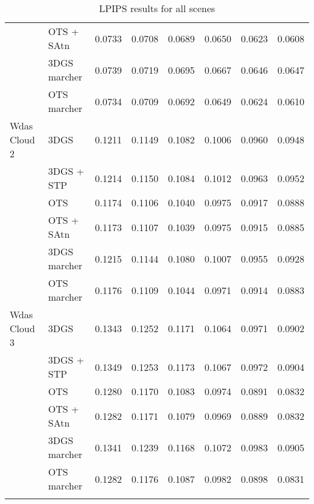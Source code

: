 \begin{longtable}[H]{llrrrrrr}
 & OTS + SAtn & 0.0733 & 0.0708 & 0.0689 & 0.0650 & 0.0623 & 0.0608 \\
 & 3DGS marcher & 0.0739 & 0.0719 & 0.0695 & 0.0667 & 0.0646 & 0.0647 \\
 & OTS marcher & 0.0734 & 0.0709 & 0.0692 & 0.0649 & 0.0624 & 0.0610 \\
Wdas Cloud 2 & 3DGS & 0.1211 & 0.1149 & 0.1082 & 0.1006 & 0.0960 & 0.0948 \\
 & 3DGS + STP & 0.1214 & 0.1150 & 0.1084 & 0.1012 & 0.0963 & 0.0952 \\
 & OTS & 0.1174 & 0.1106 & 0.1040 & 0.0975 & 0.0917 & 0.0888 \\
 & OTS + SAtn & 0.1173 & 0.1107 & 0.1039 & 0.0975 & 0.0915 & 0.0885 \\
 & 3DGS marcher & 0.1215 & 0.1144 & 0.1080 & 0.1007 & 0.0955 & 0.0928 \\
 & OTS marcher & 0.1176 & 0.1109 & 0.1044 & 0.0971 & 0.0914 & 0.0883 \\
Wdas Cloud 3 & 3DGS & 0.1343 & 0.1252 & 0.1171 & 0.1064 & 0.0971 & 0.0902 \\
 & 3DGS + STP & 0.1349 & 0.1253 & 0.1173 & 0.1067 & 0.0972 & 0.0904 \\
 & OTS & 0.1280 & 0.1170 & 0.1083 & 0.0974 & 0.0891 & 0.0832 \\
 & OTS + SAtn & 0.1282 & 0.1171 & 0.1079 & 0.0969 & 0.0889 & 0.0832 \\
 & 3DGS marcher & 0.1341 & 0.1239 & 0.1168 & 0.1072 & 0.0983 & 0.0905 \\
 & OTS marcher & 0.1282 & 0.1176 & 0.1087 & 0.0982 & 0.0898 & 0.0831 \\
\bottomrule
\caption{LPIPS results for all scenes}
\end{longtable}
